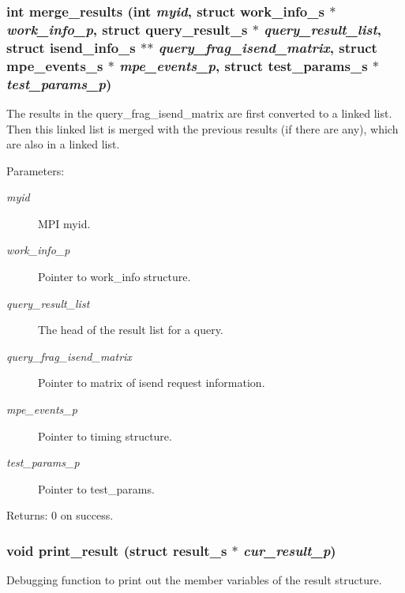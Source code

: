\subsubsection{\setlength{\rightskip}{0pt plus 5cm}int merge\_\-results (int {\em myid}, struct \bf{work\_\-info\_\-s} $\ast$ {\em work\_\-info\_\-p}, struct \bf{query\_\-result\_\-s} $\ast$ {\em query\_\-result\_\-list}, struct \bf{isend\_\-info\_\-s} $\ast$$\ast$ {\em query\_\-frag\_\-isend\_\-matrix}, struct \bf{mpe\_\-events\_\-s} $\ast$ {\em mpe\_\-events\_\-p}, struct \bf{test\_\-params\_\-s} $\ast$ {\em test\_\-params\_\-p})}\label{worker__help_8h_ce440b5131cc6f4d43173277259fc944}


The results in the query\_\-frag\_\-isend\_\-matrix are first converted to a linked list. Then this linked list is merged with the previous results (if there are any), which are also in a linked list.

\begin{Desc}
\item[Parameters:]
\begin{description}
\item[{\em myid}]MPI myid. \item[{\em work\_\-info\_\-p}]Pointer to work\_\-info structure. \item[{\em query\_\-result\_\-list}]The head of the result list for a query. \item[{\em query\_\-frag\_\-isend\_\-matrix}]Pointer to matrix of isend request information. \item[{\em mpe\_\-events\_\-p}]Pointer to timing structure. \item[{\em test\_\-params\_\-p}]Pointer to test\_\-params. \end{description}
\end{Desc}
\begin{Desc}
\item[Returns:]0 on success. \end{Desc}
\subsubsection{\setlength{\rightskip}{0pt plus 5cm}void print\_\-result (struct \bf{result\_\-s} $\ast$ {\em cur\_\-result\_\-p})}\label{worker__help_8h_d8429d14833d850c0f3f071880bf6441}


Debugging function to print out the member variables of the result structure.

